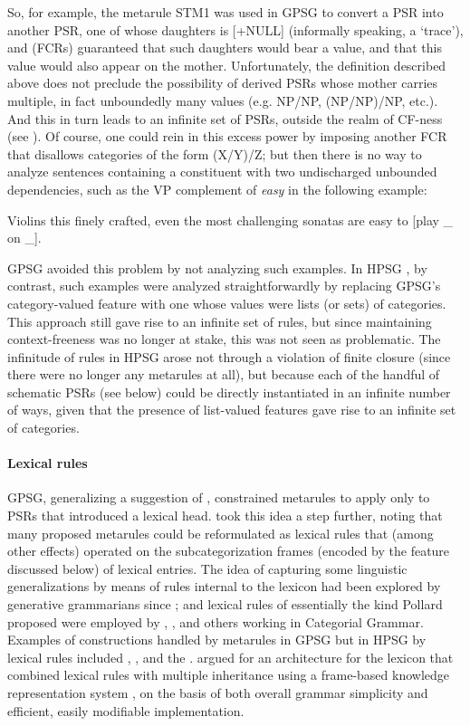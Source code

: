 \documentclass[output=paper
                ,modfonts
                ,nonflat
	        ,collection
	        ,collectionchapter
	        ,collectiontoclongg
 	        ,biblatex
                ,babelshorthands
                ,newtxmath
                ,draftmode
                ,colorlinks, citecolor=brown
]{./langsci/langscibook}
\begin{document}
So, for example, the metarule STM1 was used in GPSG to convert a PSR into another PSR, one of whose daughters is [+NULL] (informally speaking, a `trace'), and  (FCRs) guaranteed that such daughters would bear a \slasch value, and that this \slasch value would also appear on the mother. Unfortunately, the  definition described above does not preclude the possibility of derived PSRs whose mother carries multiple, in fact unboundedly many
\slasch values (e.g. NP/NP, (NP/NP)/NP, etc.). And this in turn leads to an infinite set of PSRs, outside the realm of CF-ness (see \citealt{Ristad86}).  Of course, one could rein in this excess power by imposing another FCR that disallows categories of the form (X/Y)/Z; but then there is no way to analyze sentences containing a constituent with two undischarged unbounded dependencies, such as the VP complement of \emph{easy} in the following example:

\ea
\label{ex-violins}
Violins this finely crafted, even the most challenging sonatas are easy to [play \_ on \_].
\z

\noindent
GPSG avoided this problem by not analyzing such examples. In HPSG \citep{Pollard85a-u}, by contrast, such examples were analyzed straightforwardly by replacing GPSG's category-valued \slasch feature with one whose values were lists (or sets) of categories. This approach still gave rise to an infinite set of rules, but since maintaining context-freeness was no longer at stake, this was not seen as problematic. The infinitude of rules in HPSG arose not through a violation of finite closure (since there were no longer any metarules at all), but because each of the handful of schematic PSRs (see below) could be directly instantiated in an infinite number of ways, given that the presence of list-valued
features gave rise to an infinite set of categories.

\paragraph*{Lexical rules} GPSG, generalizing a suggestion of \citet{Flickinger1983}, constrained metarules to apply only to PSRs that introduced a lexical head. \citet{Pollard85a-u} took this idea a step further, noting that many proposed metarules could be reformulated as lexical rules that (among other effects) operated on the subcategorization frames (encoded by the \subcat feature discussed below) of lexical entries. The idea of capturing some linguistic generalizations by means of rules internal to the lexicon had been explored by generative grammarians since \citet{Jackendoff75a}; and lexical rules of essentially the kind Pollard proposed were employed by \citet{Bach83}, \citet{Dowty78a}, and others working in Categorial Grammar. Examples of constructions handled by metarules in GPSG but in HPSG by lexical rules included , , and the . \citet*{FPW85a} argued for an architecture for the lexicon that combined lexical rules with multiple inheritance using a frame-based knowledge representation system \citep{Minsky1975}, on the basis of both overall grammar simplicity and efficient, easily modifiable implementation.
\end{document}
